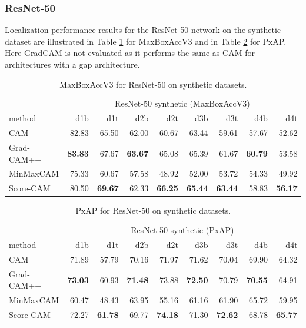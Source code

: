 \subsubsection{ResNet-50}
Localization performance results for the ResNet-50 network on the synthetic dataset are illustrated in Table \ref{tab:maxboxaccv3_resnet50_synthetic} for MaxBoxAccV3 and in Table \ref{tab:pxap_resnet50_synthetic} for PxAP. Here GradCAM is not evaluated as it performs the same as CAM for architectures with a \acrshort{gap} architecture.

\begin{table}[ht]
\centering
\begin{tabular}{lrrrrrrrr}
\toprule
 & \multicolumn{8}{c}{ResNet-50 synthetic (MaxBoxAccV3)} \\
method & d1b & d1t & d2b & d2t & d3b & d3t & d4b & d4t \\
\cmidrule(lr){1-1} \cmidrule(lr){2-9} 
CAM & 82.83 & 65.50 & 62.00 & 60.67 & 63.44 & 59.61 & 57.67 & 52.62 \\
Grad-CAM++ & \bfseries 83.83 & 67.67 & \bfseries 63.67 & 65.08 & 65.39 & 61.67 & \bfseries 60.79 & 53.58 \\
MinMaxCAM & 75.33 & 60.67 & 57.58 & 48.92 & 52.00 & 53.72 & 54.33 & 49.92 \\
Score-CAM & 80.50 & \bfseries 69.67 & 62.33 & \bfseries 66.25 & \bfseries 65.44 & \bfseries 63.44 & 58.83 & \bfseries 56.17 \\
\bottomrule
\end{tabular}
\caption[MaxBoxAccV3 for ResNet-50 on synthetic datasets]{MaxBoxAccV3 for ResNet-50 on synthetic datasets.}
\label{tab:maxboxaccv3_resnet50_synthetic}
\end{table}

\begin{table}[ht]
\centering
\begin{tabular}{lrrrrrrrr}
\toprule
 & \multicolumn{8}{c}{ResNet-50 synthetic (PxAP)} \\
method & d1b & d1t & d2b & d2t & d3b & d3t & d4b & d4t \\
\cmidrule(lr){1-1} \cmidrule(lr){2-9} 
CAM & 71.89 & 57.79 & 70.16 & 71.97 & 71.62 & 70.04 & 69.90 & 64.32 \\
Grad-CAM++ & \bfseries 73.03 & 60.93 & \bfseries 71.48 & 73.88 & \bfseries 72.50 & 70.79 & \bfseries 70.55 & 64.91 \\
MinMaxCAM & 60.47 & 48.43 & 63.95 & 55.16 & 61.16 & 61.90 & 65.72 & 59.95 \\
Score-CAM & 72.27 & \bfseries 61.78 & 69.77 & \bfseries 74.18 & 71.30 & \bfseries 72.62 & 68.78 & \bfseries 65.77 \\
\bottomrule
\end{tabular}
\caption[PxAP for ResNet-50 on synthetic datasets]{PxAP for ResNet-50 on synthetic datasets.}
\label{tab:pxap_resnet50_synthetic}
\end{table}

